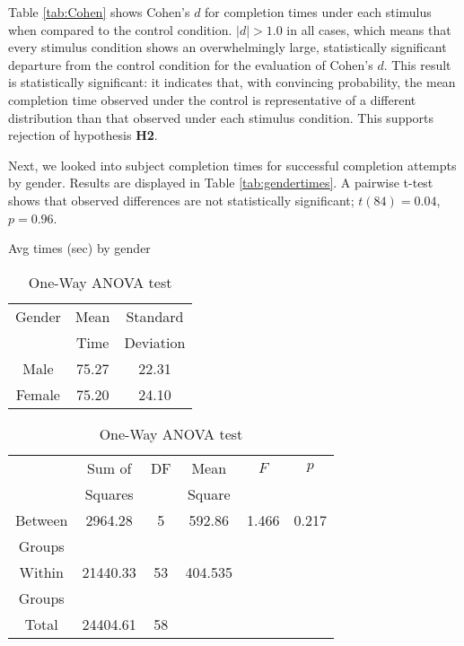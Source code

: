\documentclass{llncs}
\begin{document}
Table \ref{tab:Cohen} shows Cohen's $d$ for completion times under each stimulus when compared to 
the control condition. $|d| > 1.0$ in all cases, which means that every stimulus condition shows an 
overwhelmingly large, statistically significant departure from the control condition for the evaluation of 
Cohen's $d$. This result is statistically significant: it indicates that, with convincing probability, the 
mean completion time observed under the control is representative of a different distribution than 
that observed under each stimulus condition. This supports rejection of hypothesis \textbf{H2}.

Next, we looked into subject completion times for successful completion attempts by gender.
Results are displayed in Table \ref{tab:gendertimes}. A pairwise t-test shows that 
observed differences are not statistically significant; $t(84)=0.04$, $p=0.96$. 

\begin{table}[ht!]
\parbox{.45\textwidth}{
\small
\centering 
\caption{\scriptsize Avg times (sec) by gender}
\label{tab:gendertimes}
{\setlength{\extrarowheight}{10pt}
\begin{tabular}{||c|c|c||}
\hline \cline{1-3}
Gender & Mean  & Standard 
\vspace*{-0.3cm} \\
  & Time    & Deviation 
\\ \hline \cline{1-3}
Male & 75.27 & 22.31
\\ \hline
Female & 75.20 & 24.10
\\ \hline \cline{1-3}
\end{tabular}}
}
\hfill
\parbox{.45\textwidth}{
\small
\centering
\caption{\scriptsize One-Way ANOVA test} %
\label{tab:ANOVA2}
{\setlength{\extrarowheight}{10pt}
\begin{tabular}{||c|c|c|c|c|c||}
\hline \cline{1-6}
 & Sum of  & DF &Mean &$F$ & $p$\vspace*{-0.3cm}\\
 & Squares   & & Square& & 
\\ \hline \cline{1-3}
Between & 2964.28 & 5 & 592.86 & 1.466 & 0.217 \vspace*{-0.3cm}\\
Groups& &&&&
\\ \hline
Within & 21440.33 & 53 & 404.535 & &  \vspace*{-0.3cm}\\
Groups&&&&&
\\ \hline
Total & 24404.61 & 58 & & &
\\ \hline \cline{1-6}
\end{tabular}}
}
\end{table}
\end{document}
